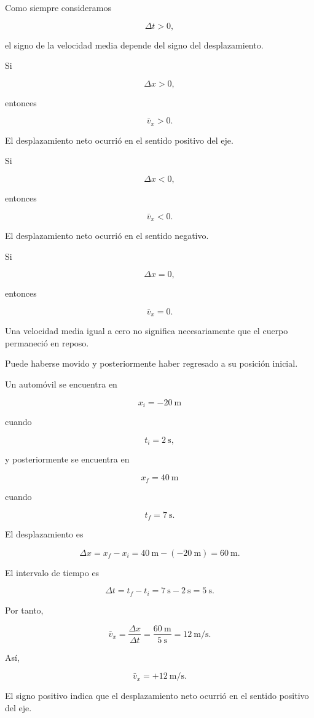 Como siempre consideramos

\[ \Delta t>0, \]

el signo de la velocidad media depende del signo del desplazamiento.

Si

\[ \Delta x>0, \]

entonces

\[ \bar{v}_x>0. \]

El desplazamiento neto ocurrió en el sentido positivo del eje.

Si

\[ \Delta x<0, \]

entonces

\[ \bar{v}_x<0. \]

El desplazamiento neto ocurrió en el sentido negativo.

Si

\[ \Delta x=0, \]

entonces

\[ \bar{v}_x=0. \]

\begin{advertencia}
Una velocidad media igual a cero no significa necesariamente que el cuerpo
permaneció en reposo.

Puede haberse movido y posteriormente haber regresado a su posición inicial.
\end{advertencia}


\begin{ejemplo}

Un automóvil se encuentra en

\[ x_i=-\SI{20}{\meter} \]

cuando

\[ t_i=\SI{2}{\second}, \]

y posteriormente se encuentra en

\[ x_f=\SI{40}{\meter} \]

cuando

\[ t_f=\SI{7}{\second}. \]

El desplazamiento es

\[
\Delta x=x_f-x_i
=\SI{40}{\meter}-(-\SI{20}{\meter})
=\SI{60}{\meter}.
\]

El intervalo de tiempo es

\[
\Delta t=t_f-t_i
=\SI{7}{\second}-\SI{2}{\second}
=\SI{5}{\second}.
\]

Por tanto,

\[
\bar{v}_x
=\frac{\Delta x}{\Delta t}
=\frac{\SI{60}{\meter}}{\SI{5}{\second}}
=\SI{12}{\meter\per\second}.
\]

Así,

\[ \boxed{\bar{v}_x=+\SI{12}{\meter\per\second}}. \]

El signo positivo indica que el desplazamiento neto ocurrió en el sentido
positivo del eje.
\end{ejemplo}



